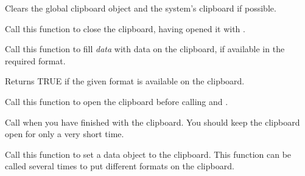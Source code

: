\label{wxclipboardclear}


Clears the global clipboard object and the system's clipboard if possible.

\label{wxclipboardclose}


Call this function to close the clipboard, having opened it with .

\label{wxclipboardgetdata}


Call this function to fill {\it data} with data on the clipboard, if available in the required
format.

\label{wxclipboardissupportedformat}


Returns TRUE if the given format is available on the clipboard.




\label{wxclipboardopen}


Call this function to open the clipboard before calling  
and .

Call  when you have finished with the clipboard. You
should keep the clipboard open for only a very short time.

\label{wxclipboardsetdata}


Call this function to set a data object to the clipboard. This function can be called several times
to put different formats on the clipboard.

